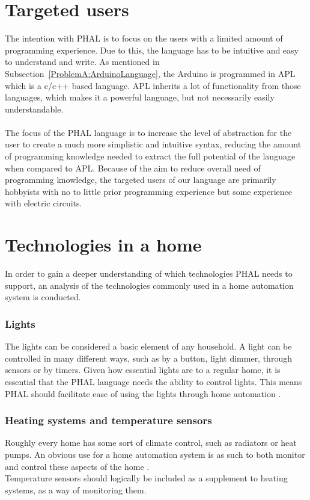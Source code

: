 \section{Targeted users}\label{ProblemA:Users}
The intention with PHAL is to focus on the users with a limited amount of programming experience. Due to this, the language has to be intuitive and easy to understand and write. As mentioned in Subsection~\ref{ProblemA:ArduinoLanguage}, the Arduino is programmed in APL which is a c/c++ based language. APL inherits a lot of functionality from those languages, which makes it a powerful language, but not necessarily easily understandable.
\\\\
The focus of the PHAL language is to increase the level of abstraction for the user to create a much more simplistic and intuitive syntax, reducing the amount of programming knowledge needed to extract the full potential of the language when compared to APL. Because of the aim to reduce overall need of programming knowledge, the targeted users of our language are primarily hobbyists with no to little prior programming experience but some experience with electric circuits. 

\section{Technologies in a home}
In order to gain a deeper understanding of which technologies PHAL needs to support, an analysis of the technologies commonly used in a home automation system is conducted. 

\subsubsection{Lights}
The lights can be considered a basic element of any household. A light can be controlled in many different ways, such as by a button, light dimmer, through sensors or by timers. Given how essential lights are to a regular home, it is essential that the PHAL language needs the ability to control lights. This means PHAL should facilitate ease of using the lights through home automation \cite{BenefitsAndRisksOfSmartHomeTechnologies}.

\subsubsection{Heating systems and temperature sensors}
Roughly every home has some sort of climate control, such as radiators or heat pumps. An obvious use for a home automation system is as such to both monitor and control these aspects of the home \cite{BenefitsAndRisksOfSmartHomeTechnologies}.\\
Temperature sensors should logically be included as a supplement to heating systems, as a way of monitoring them.
